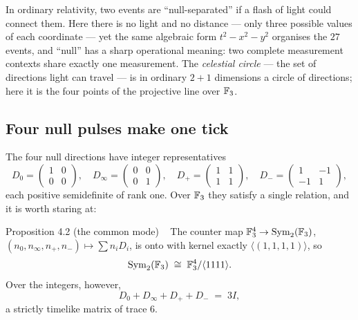 \begin{plainwords}
In ordinary relativity, two events are ``null-separated'' if a flash of light could
connect them. Here there is no light and no distance --- only three possible values of
each coordinate --- yet the same algebraic form $t^2-x^2-y^2$ organises the $27$ events,
and ``null'' has a sharp operational meaning: two complete measurement contexts share
exactly one measurement. The \emph{celestial circle} --- the set of directions light can
travel --- is in ordinary $2+1$ dimensions a circle of directions; here it is the four
points of the projective line over $\mathbb{F}_3$.
\end{plainwords}

\subsection{Four null pulses make one tick}

The four null directions have integer representatives
\[
D_0=\begin{pmatrix}1&0\\0&0\end{pmatrix},\quad
D_\infty=\begin{pmatrix}0&0\\0&1\end{pmatrix},\quad
D_+=\begin{pmatrix}1&1\\1&1\end{pmatrix},\quad
D_-=\begin{pmatrix}1&-1\\-1&1\end{pmatrix},
\]
each positive semidefinite of rank one. Over $\mathbb{F}_3$ they satisfy a single relation, and
it is worth staring at:

\begin{result}{Proposition 4.2 (the common mode) \hfill \tierT\ \tierC}
The counter map $\mathbb{F}_3^4\to\mathrm{Sym}_2(\mathbb{F}_3)$, $(n_0,n_\infty,n_+,n_-)\mapsto
\sum n_iD_i$, is onto with kernel exactly $\langle(1,1,1,1)\rangle$, so
\[
\mathrm{Sym}_2(\mathbb{F}_3)\;\cong\;\mathbb{F}_3^4/\langle 1111\rangle .
\]
Over the integers, however,
\[
D_0+D_\infty+D_++D_-\;=\;3I ,
\]
a strictly timelike matrix of trace $6$.
\end{result}

